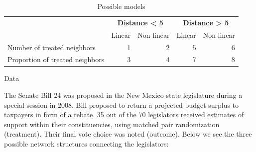 \documentclass[final]{beamer}
\newlength{\onecolwid}
\newlength{\onecolwidd}
\begin{document}
\begin{frame}[t]
\begin{columns}[t]
\begin{column}{\onecolwidd}
	\begin{rmfamily}						
	\begin{table}
        	\begin{tabular}{lrrrr}\toprule
            &\multicolumn{2}{c}{\textbf{Distance < 5}}&\multicolumn{2}{c}{\textbf{Distance > 5}}
            \\\cmidrule(r){2-3}\cmidrule(r){4-5}
            &Linear&Non-linear&Linear&Non-linear\\\midrule
            Number of treated neighbors    & 1 & 2
                    & 5 & 6\\
            Proportion of treated neighbors   & 3 & 4
                    & 7 & 8
            \\\bottomrule
        	\end{tabular}
        	\caption{Possible models}\label{Tab2}
	\end{table}
	\end{rmfamily}						
	
	\begin{block}{Data}
	\begin{rmfamily}
	
	The Senate Bill 24 was proposed in the New Mexico state legislature during a special session in 2008. Bill proposed to return a projected budget surplus to taxpayers in form of a rebate. 35 out of the 70 legislators received estimates of support within their constituencies, using matched pair randomization (treatment). Their final vote choice was noted (outcome). Below we see the three possible network structures connecting the legislators:
	
	\hspace{2cm}


\end{rmfamily}
\end{block}
\end{column}
\end{columns}
\end{frame}
\end{document}
